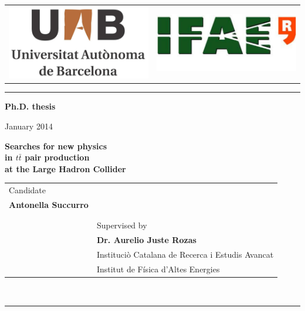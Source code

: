 \documentclass[titlepage]{article}
\begin{document}
\centering
\par
\vspace{6pt}
\begin{tabular}{p{5cm}p{5cm}}
\includegraphics[width=.23\textwidth]{uab_logo}&
\includegraphics[width=.3\textwidth]{ifae_logo}\\
\end{tabular}
\par
\vspace{6pt}
\hrule 
\par
\vspace{6pt}
\par
\begin{large}\textbf{Ph.D. thesis}\\
\par
\vspace{2pt}
\par
January 2014 \\ 
\end{large} 
\vspace{120pt}
{\huge \bfseries  Searches for new physics} \\
\vspace{6pt}
{\huge \bfseries in $t\bar{t}$ pair production} \\
\vspace{6pt}
{\huge \bfseries at the Large Hadron Collider}
\vspace{180pt} \\
\centering
\begin{tabular}{p{6cm}p{9cm}}
\large Candidate &  \\
\Large \bfseries Antonella Succurro & \\
 & \\
 & \\
 & \large Supervised by \\
 &\Large \bfseries Dr. Aurelio Juste Rozas\\
 &\large Instituciò Catalana de Recerca i Estudis Avancat\\
 &\large Institut de F\'isica d’Altes Energies\\
\end{tabular}
\vspace{120pt} \\
\hrule \vspace{6pt}
\large 
\end{document}
